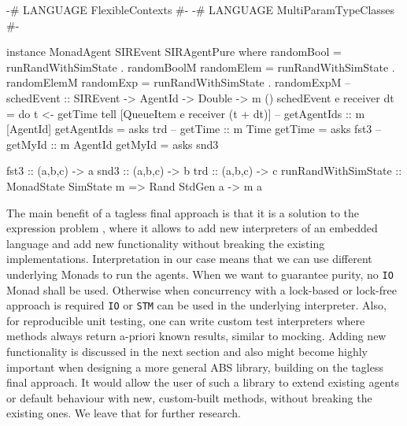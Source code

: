 \begin{HaskellCode}   
{-# LANGUAGE FlexibleContexts           #-}
{-# LANGUAGE MultiParamTypeClasses      #-}
      
instance MonadAgent SIREvent SIRAgentPure where
  randomBool = runRandWithSimState . randomBoolM
  randomElem = runRandWithSimState . randomElemM
  randomExp  = runRandWithSimState . randomExpM
  -- schedEvent :: SIREvent -> AgentId -> Double -> m ()
  schedEvent e receiver dt = do
    t <- getTime 
    tell [QueueItem e receiver (t + dt)]
  -- getAgentIds :: m [AgentId]
  getAgentIds = asks trd
  -- getTime :: m Time
  getTime = asks fst3
  -- getMyId :: m AgentId
  getMyId = asks snd3

fst3 :: (a,b,c) -> a
snd3 :: (a,b,c) -> b
trd :: (a,b,c) -> c
runRandWithSimState :: MonadState SimState m => Rand StdGen a -> m a
\end{HaskellCode}

The main benefit of a tagless final approach is that it is a solution to the expression problem \cite{kiselyov_typed_2012}, where it allows to add new interpreters of an embedded language and add new functionality without breaking the existing implementations. Interpretation in our case means that we can use different underlying Monads to run the agents. When we want to guarantee purity, no \texttt{IO} Monad shall be used. Otherwise when concurrency with a lock-based or lock-free approach is required \texttt{IO} or \texttt{STM} can be used in the underlying interpreter. Also, for reproducible unit testing, one can write custom test interpreters where methods always return a-priori known results, similar to mocking. Adding new functionality is discussed in the next section and also might become highly important when designing a more general ABS library, building on the tagless final approach. It would allow the user of such a library to extend existing agents or default behaviour with new, custom-built methods, without breaking the existing ones. We leave that for further research.